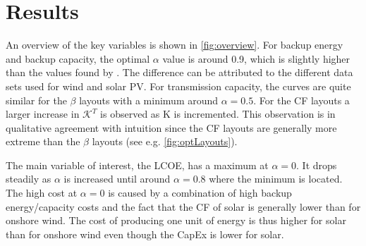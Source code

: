 \documentclass[a4paper, 5p, sort&compress]{elsarticle}%
\begin{document}
\FloatBarrier

\section{Results}
\label{sec:results}

An overview of the key variables is shown in \cref{fig:overview}. For
backup energy and backup capacity, the optimal $\alpha$ value is around
0.9, which is slightly higher than the values found by
\cite{Heide2010,Heide2011}. The difference can be attributed to the
different data sets used for wind and solar PV. For transmission
capacity, the curves are quite similar for the $\beta$ layouts with a
minimum around $\alpha = 0.5$. For the CF layouts a larger increase in
$\mathcal{K}^{T}$ is observed as K is incremented. This observation is
in qualitative agreement with intuition since the CF layouts are
generally more extreme than the $\beta$ layouts (see
e.g. \cref{fig:optLayouts}).


The main variable of interest, the LCOE, has a maximum at $\alpha = 0$. It
drops steadily as $\alpha$ is increased until around
$\alpha = 0.8$ where the minimum is located. The high cost at
$\alpha = 0$ is caused by a combination of high backup energy/capacity
costs and the fact that the CF of solar is generally lower than for
onshore wind. The cost of producing one unit of energy is thus higher for
solar than for onshore wind even though the CapEx is lower for solar.
\end{document}
